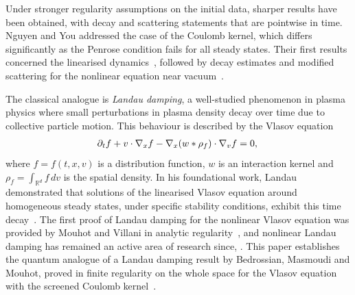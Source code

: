 \documentclass[JEP,XML,SOM,Unicode]{cedram}
\theoremstyle{plain}
\theoremstyle{remark}
\newcommand{\p}{\partial}
\newcommand{\R}{\mathbb{R}}
\begin{document}
Under stronger regularity assumptions on the initial data, sharper results have been obtained, with decay and scattering statements that are pointwise in time. Nguyen and You addressed the case of the Coulomb kernel, which differs significantly as the Penrose condition fails for all steady states. Their first results concerned the linearised dynamics~\cite{NguyenYou2023}, followed by decay estimates and modified scattering for the nonlinear equation near vacuum~\cite{NguyenYou2024}.

The classical analogue is \textit{Landau damping}, a well-studied phenomenon in plasma physics where small perturbations in plasma density decay over time due to collective particle motion. This behaviour is described by the Vlasov equation
\begin{align}\label{VP}
\p_tf+v\cdot\nabla_xf-\nabla_x(w*\rho_f)\cdot\nabla_vf=0,\vphantom{2_B}
\end{align}where $f=f(t,x,v)$ is a distribution function, $w$ is an interaction kernel and $\rho_f=\int_{\R^d} f\,dv$ is the spatial density. In his foundational work, Landau demonstrated that solutions of the linearised Vlasov equation around homogeneous steady states, under specific stability conditions, exhibit this time decay~\cite{Landaupaper1946}. The first proof of Landau damping for the nonlinear Vlasov equation was provided by Mouhot and Villani in analytic regularity~\cite{mou-vil-2011}, and nonlinear Landau damping has remained an active area of research since, \eg \cite{bed-mas-mou-2016,BedrossianMasmoudiMouhot2018,GrenierNguyenRodnianski2021,BedrossianMasmoudiMouhot2022,IonescuPausaderWangWidmayer2024Poisson}. This paper establishes the quantum analogue of a Landau damping result by Bedrossian, Masmoudi and Mouhot, proved in finite regularity on the whole space for the Vlasov equation with the screened Coulomb kernel~\cite{BedrossianMasmoudiMouhot2018}.
\end{document}
